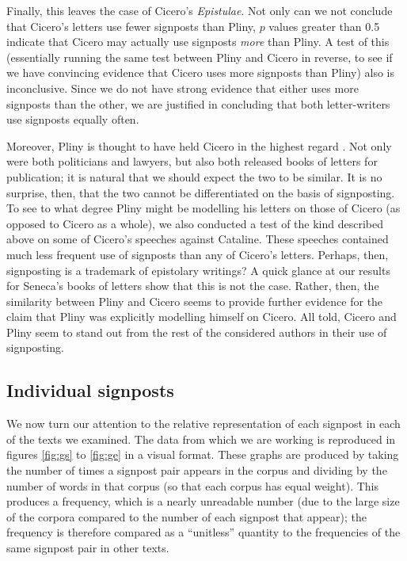 Finally, this leaves the case of Cicero's \textit{Epistulae}. Not only can we not conclude that Cicero's letters use fewer signposts than Pliny, $p$ values greater than 0.5 indicate that Cicero may actually use signposts \textit{more} than Pliny. A test of this (essentially running the same test between Pliny and Cicero in reverse, to see if we have convincing evidence that Cicero uses more signposts than Pliny) also is inconclusive. Since we do not have strong evidence that either uses more signposts than the other, we are justified in concluding that both letter-writers use signposts equally often. 

Moreover, Pliny is thought to have held Cicero in the highest regard \cite{plinycicero1} \cite{plinycicero2}. Not only were both politicians and lawyers, but also both released books of letters for publication; it is natural that we should expect the two to be similar. It is no surprise, then, that the two cannot be differentiated on the basis of signposting. To see to what degree Pliny might be modelling his letters on those of Cicero (as opposed to Cicero as a whole), we also conducted a test of the kind described above on some of Cicero's speeches against Cataline. These speeches contained much less frequent use of signposts than any of Cicero's letters. Perhaps, then, signposting is a trademark of epistolary writings? A quick glance at our results for Seneca's books of letters show that this is not the case. Rather, then, the similarity between Pliny and Cicero seems to provide further evidence for the claim that Pliny was explicitly modelling himself on Cicero. All told, Cicero and Pliny seem to stand out from the rest of the considered authors in their use of signposting.

\subsection{Individual signposts}
\label{sec:plots}

We now turn our attention to the relative representation of each signpost in each of the texts we examined. The data from which we are working is reproduced in figures \ref{fig:gs} to \ref{fig:ge} in a visual format. These graphs are produced by taking the number of times a signpost pair appears in the corpus and dividing by the number of words in that corpus (so that each corpus has equal weight). This produces a frequency, which is a nearly unreadable number (due to the large size of the corpora compared to the number of each signpost that appear); the frequency is therefore compared as a ``unitless'' quantity to the frequencies of the same signpost pair in other texts.


